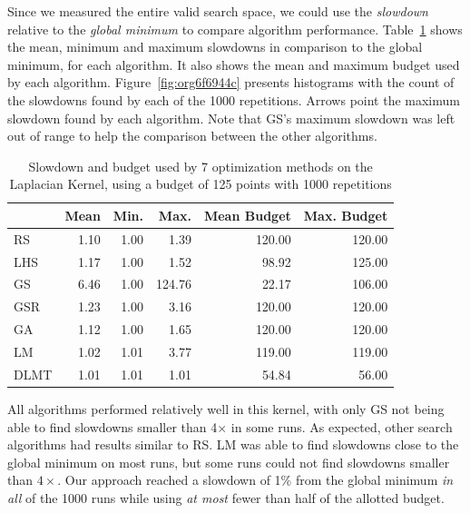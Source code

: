 \documentclass[conference]{IEEEtran}
\begin{document}
Since  we measured  the entire  valid search  space, we  could use  the \emph{slowdown}
relative   to   the   \emph{global   minimum}   to   compare   algorithm   performance.
Table~\ref{tab:gpu_laplacian_compare_budget}  shows the  mean, minimum  and maximum
slowdowns in comparison to the global minimum, for each algorithm. It also shows
the     mean    and     maximum     budget    used     by    each     algorithm.
Figure~\ref{fig:org6f6944c} presents histograms with the count
of the slowdowns found by each of the 1000 repetitions. Arrows point the maximum
slowdown found by  each algorithm. Note that GS's maximum  slowdown was left out
of range to help the comparison between the other algorithms.

\begin{table}[b]
\centering
\caption{Slowdown and budget used by 7 optimization methods on the Laplacian Kernel, using a budget of 125 points with 1000 repetitions}
\label{tab:gpu_laplacian_compare_budget}
\begingroup\footnotesize
\begin{tabular}{lrrrrr}
  \toprule
 & Mean & Min. & Max. & Mean Budget & Max. Budget \\
  \midrule
RS & 1.10 & 1.00 & 1.39 & 120.00 & 120.00 \\
  LHS & 1.17 & 1.00 & 1.52 & 98.92 & 125.00 \\
  GS & 6.46 & 1.00 & 124.76 & 22.17 & 106.00 \\
  GSR & 1.23 & 1.00 & 3.16 & 120.00 & 120.00 \\
  GA & 1.12 & 1.00 & 1.65 & 120.00 & 120.00 \\
  LM & 1.02 & 1.01 & 3.77 & 119.00 & 119.00 \\
   \rowcolor{red!25}DLMT & 1.01 & 1.01 & 1.01 & 54.84 & 56.00 \\
   \bottomrule
\end{tabular}
\endgroup
\end{table}

All algorithms performed relatively well in  this kernel, with only GS not being
able to find slowdowns smaller than 4\(\times\) in some runs. As expected, other search
algorithms had results similar to RS. LM was able to find slowdowns close to the
global minimum on most runs, but some runs could not find slowdowns smaller than
\(4\times\). Our approach  reached a slowdown of  1\% from the global minimum  \emph{in all} of
the 1000 runs while using \emph{at most} fewer than half of the allotted budget.
\end{document}

